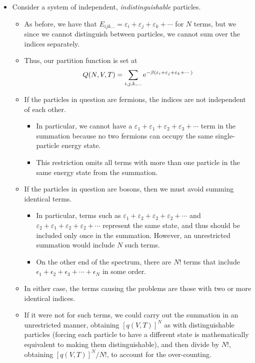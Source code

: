 \documentclass[../notes.tex]{subfiles}
\begin{document}
\begin{itemize}
    \item Consider a system of independent, \emph{indistinguishable} particles.
    \begin{itemize}
        \item As before, we have that $E_{ijk\dots}=\varepsilon_i+\varepsilon_j+\varepsilon_k+\cdots$ for $N$ terms, but we since we cannot distinguish between particles, we cannot sum over the indices separately.
        \item Thus, our partition function is set at
        \begin{equation*}
            Q(N,V,T) = \sum_{i,j,k,\dots}\e[-\beta(\varepsilon_i+\varepsilon_j+\varepsilon_k+\cdots)]
        \end{equation*}
        \item If the particles in question are fermions, the indices are not independent of each other.
        \begin{itemize}
            \item In particular, we cannot have a $\varepsilon_1+\varepsilon_1+\varepsilon_2+\varepsilon_3+\cdots$ term in the summation because no two fermions can occupy the same single-particle energy state.
            \item This restriction omits all terms with more than one particle in the same energy state from the summation.
        \end{itemize}
        \item If the particles in question are bosons, then we must avoid summing identical terms.
        \begin{itemize}
            \item In particular, terms such as $\varepsilon_1+\varepsilon_2+\varepsilon_2+\varepsilon_2+\cdots$ and $\varepsilon_2+\varepsilon_1+\varepsilon_2+\varepsilon_2+\cdots$ represent the same state, and thus should be included only once in the summation. However, an unrestricted summation would include $N$ such terms.
            \item On the other end of the spectrum, there are $N!$ terms that include $\epsilon_1+\epsilon_2+\epsilon_3+\cdots+\epsilon_N$ in some order.
        \end{itemize}
        \item In either case, the terms causing the problems are those with two or more identical indices.
        \item If it were not for such terms, we could carry out the summation in an unrestricted manner, obtaining $[q(V,T)]^N$ as with distinguishable particles (forcing each particle to have a different state is mathematically equivalent to making them distinguishable), and then divide by $N!$, obtaining $[q(V,T)]^N/N!$, to account for the over-counting.

\end{itemize}
\end{itemize}
\end{document}
